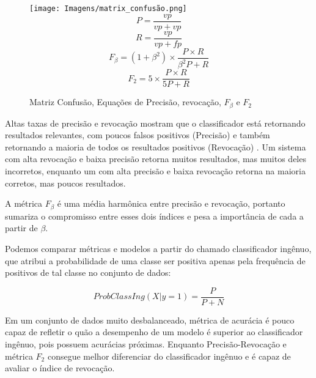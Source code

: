 \begin{figure}[!ht]
\begin{minipage}[c]{0.4\textwidth}
    \end{minipage}%
    \begin{minipage}{0.5\textwidth}
        \texttt{[image: Imagens/matrix\_confusão.png]}
        \begin{equation} P = \frac{vp}{vp + vp} \end{equation}
        \begin{equation}R = \frac{vp}{vp + fp}\end{equation}
        \begin{equation}F_\beta = (1+\beta^2) \times \frac {P \times R}{\beta^2 P + R}\end{equation}
        \begin{equation}F_2 = 5 \times \frac {P \times R}{5 P + R}\end{equation}
        \caption{Matriz Confusão, Equações de Precisão, revocação, $F_\beta$ e $F_2$}        
    \end{minipage}       
    \label{fig:metricas}
\end{figure}

Altas taxas de precisão e revocação mostram que o classificador está retornando resultados relevantes, com poucos falsos positivos (Precisão) e também retornando a maioria de todos os resultados positivos (Revocação) \cite{hastie01statisticallearning}. Um sistema com alta revocação e baixa precisão retorna muitos resultados, mas muitos deles incorretos, enquanto um com alta precisão e baixa revocação retorna na maioria corretos, mas poucos resultados.

A métrica $F_\beta$ é uma média harmônica entre precisão e revocação, portanto sumariza o compromisso entre esses dois índices  e pesa a importância de cada a partir de $\beta$.

Podemos comparar métricas e modelos a partir do chamado classificador ingênuo, que atribui a probabilidade de uma classe ser positiva apenas pela frequência de positivos de tal classe no conjunto de dados:

\begin{equation}
    ProbClassIng(X|y=1) = \frac{P}{P + N}
\end{equation}

Em um conjunto de dados muito desbalanceado, métrica de acurácia é pouco capaz de refletir o quão a desempenho de um modelo é superior ao classificador ingênuo, pois possuem acurácias próximas. Enquanto Precisão-Revocação e métrica $F_2$ consegue melhor diferenciar do classificador ingênuo e é capaz de avaliar o índice de revocação.

